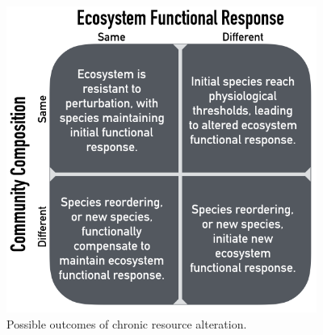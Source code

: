 \documentclass[fleqn,10pt,lineno]{wlpeerj} %
\begin{document}
\begin{figure}[!ht]
  \centering
      \includegraphics[width=4in]{../figures/hypothesis_figtable.png}
  \caption{Possible outcomes of chronic resource alteration.}
\end{figure}

\newpage{}
\end{document}
